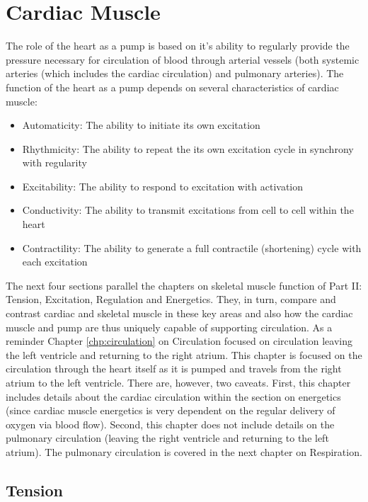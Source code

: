 \section{Cardiac Muscle}

The role of the heart as a pump is based on it's ability to regularly provide the pressure necessary for circulation of blood through arterial vessels (both systemic arteries (which includes the cardiac circulation) and pulmonary arteries). The function of the heart as a pump depends on several characteristics of cardiac muscle:

\begin{itemize}
    
    \item Automaticity: The ability to initiate its own excitation
    \item Rhythmicity: The ability to repeat the its own excitation cycle in synchrony with regularity
    \item Excitability: The ability to respond to excitation with activation
    \item Conductivity: The ability to transmit excitations from cell to cell within the heart
    \item Contractility: The ability to generate a full contractile (shortening) cycle with each excitation
 
\end{itemize}

The next four sections parallel the chapters on skeletal muscle function of Part II: Tension, Excitation, Regulation and Energetics. They, in turn, compare and contrast cardiac and skeletal muscle in these key areas and also how the cardiac muscle and pump are thus uniquely capable of supporting circulation. As a reminder Chapter \ref{chp:circulation} on Circulation focused on circulation leaving the left ventricle and returning to the right atrium. This chapter is focused on the circulation through the heart itself as it is pumped and travels from the right atrium to the left ventricle. There are, however, two caveats. First, this chapter includes details about the cardiac circulation within the section on energetics (since cardiac muscle energetics is very dependent on the regular delivery of oxygen via blood flow). Second, this chapter does not include details on the pulmonary circulation (leaving the right ventricle and returning to the left atrium). The pulmonary circulation is covered in the next chapter on Respiration.

\subsection{Tension}

